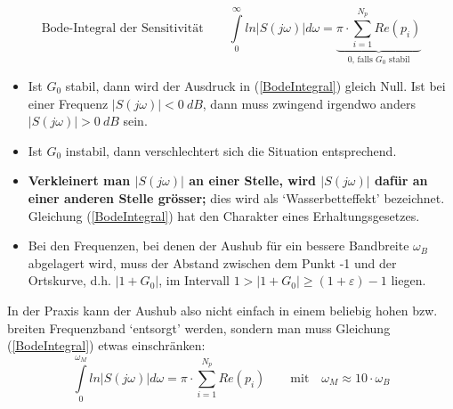 \begin{equation}
\textrm{Bode-Integral der Sensitivität} \qquad
\int\limits_{0}^{\infty}ln|S(j\omega)|d\omega =\underbrace{\pi\cdot\sum\limits_{i=1}^{N_{p}}Re(p_i)}_\textrm{0, falls $G_0$ stabil}
\label{BodeIntegral}
\end{equation}

\begin{itemize}
	\item Ist $G_0$ stabil, dann wird der Ausdruck in (\ref{BodeIntegral}) gleich Null. Ist bei einer Frequenz
	$|S(j\omega)| < 0 \ dB$, dann muss zwingend irgendwo anders $|S(j\omega)| > 0 \ dB$ sein.
  \item Ist $G_0$ instabil, dann verschlechtert sich die Situation entsprechend.
	\item \textbf{Verkleinert man $|S(j\omega)|$ an einer Stelle, wird $|S(j\omega)|$ dafür an einer anderen
	Stelle grösser;} dies wird als ‘Wasserbetteffekt’ bezeichnet.
	Gleichung (\ref{BodeIntegral}) hat den Charakter eines Erhaltungsgesetzes.
	\item Bei den Frequenzen, bei denen
	der Aushub für ein bessere Bandbreite $\omega_B$ abgelagert wird, muss der Abstand zwischen dem Punkt -1 und der
	Ortskurve, d.h. $|1 + G_0|$, im Intervall $1 > |1 + G_0| \geq (1 + \varepsilon)-1$ liegen.
\end{itemize}

In der Praxis kann der Aushub also nicht einfach in einem beliebig hohen bzw.
breiten Frequenzband ‘entsorgt’ werden, sondern man muss Gleichung (\ref{BodeIntegral}) etwas
einschränken:
\begin{equation}
\int\limits_{0}^{\omega_M}ln|S(j\omega)|d\omega =\pi\cdot\sum\limits_{i=1}^{N_{p}}Re(p_i) \qquad \text{mit} \quad \omega_M \approx 10 \cdot \omega_B
\end{equation}